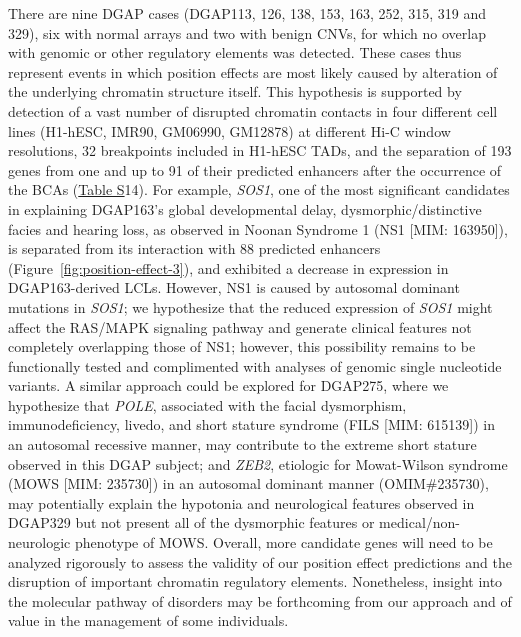 \documentclass[a4paper,twoside=true,openright,parskip=full,chapterprefix=true,11pt,headings=normal,bibliography=totoc,listof=totoc,titlepage=on,captions=tableabove,draft=false]{scrreprt}
\theoremstyle{definition}
\theoremstyle{definition}
\theoremstyle{definition}
\theoremstyle{remark}
\begin{document}
There are nine DGAP cases (DGAP113, 126, 138, 153, 163, 252, 315, 319
and 329), six with normal arrays and two with benign CNVs, for which no
overlap with genomic or other regulatory elements was detected. These
cases thus represent events in which position effects are most likely
caused by alteration of the underlying chromatin structure itself. This
hypothesis is supported by detection of a vast number of disrupted
chromatin contacts in four different cell lines (H1-hESC, IMR90,
GM06990, GM12878) at different Hi-C window resolutions, 32 breakpoints
included in H1-hESC TADs,\citep{Dixon2012} and the separation of 193
genes from one and up to 91 of their predicted enhancers after the
occurrence of the BCAs
(\protect\hyperlink{position-effect-sub-tab}{Table S}14). For example,
\emph{SOS1}, one of the most significant candidates in explaining
DGAP163's global developmental delay, dysmorphic/distinctive facies and
hearing loss, as observed in Noonan Syndrome 1 (NS1 {[}MIM: 163950{]}),
is separated from its interaction with 88 predicted enhancers
(Figure~\ref{fig:position-effect-3}), and exhibited a decrease in
expression in DGAP163-derived LCLs. However, NS1 is caused by autosomal
dominant mutations in \emph{SOS1}; we hypothesize that the reduced
expression of \emph{SOS1} might affect the RAS/MAPK signaling pathway
and generate clinical features not completely overlapping those of NS1;
however, this possibility remains to be functionally tested and
complimented with analyses of genomic single nucleotide variants. A
similar approach could be explored for DGAP275, where we hypothesize
that \emph{POLE}, associated with the facial dysmorphism,
immunodeficiency, livedo, and short stature syndrome (FILS {[}MIM:
615139{]}) in an autosomal recessive manner,\citep{PachlopnikSchmid2012}
may contribute to the extreme short stature observed in this DGAP
subject; and \emph{ZEB2}, etiologic for Mowat-Wilson syndrome (MOWS
{[}MIM: 235730{]}) in an autosomal dominant manner (OMIM\#235730), may
potentially explain the hypotonia and neurological features observed in
DGAP329 but not present all of the dysmorphic features or
medical/non-neurologic phenotype of MOWS. Overall, more candidate genes
will need to be analyzed rigorously to assess the validity of our
position effect predictions and the disruption of important chromatin
regulatory elements. Nonetheless, insight into the molecular pathway of
disorders may be forthcoming from our approach and of value in the
management of some individuals.
\end{document}

